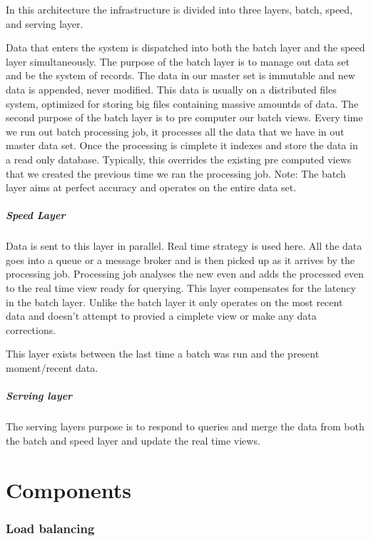 \documentclass[a4paper, 11pt]{book}
\begin{document}
    In this architecture the infrastructure is divided into three layers, batch, speed, and serving layer.

    Data that enters the system is dispatched into both the batch layer and the speed layer simultaneously.
    The purpose of the batch layer is to manage out data set and be the system of records.
    The data in our master set is immutable and new data is appended, never modified.
    This data is usually on a distributed files system, optimized for storing big files containing massive amountds of data.
    The second purpose of the batch layer is to pre computer our batch views.
    Every time we run out batch processing job, it processes all the data that we have in out master data set. Once the processing is cimplete it indexes and store the data in a read only database.
    Typically, this overrides the existing pre computed views that we created the previous time we ran the processing job.
    Note: The batch layer aims at perfect accuracy and operates on the entire data set.

    \paragraph{Speed Layer}
    Data is sent to this layer in parallel.
    Real time strategy is used here.
    All the data goes into a queue or a message broker and is then picked up as it arrives by the processing job.
    Processing job analyses the new even and adds the processed even to the real time view ready for querying.
    This layer compensates for the latency in the batch layer.
    Unlike the batch layer it only operates on the most recent data and doesn't attempt to provied a cimplete view or make any data corrections.

    This layer exists between the last time a batch was run and the present moment/recent data.

    \paragraph{Serving layer}
    The serving layers purpose is to respond to queries and merge the data from both the batch and speed layer and update the real time views.


    \chapter{Components}

    \subsection{Load balancing}
\end{document}
